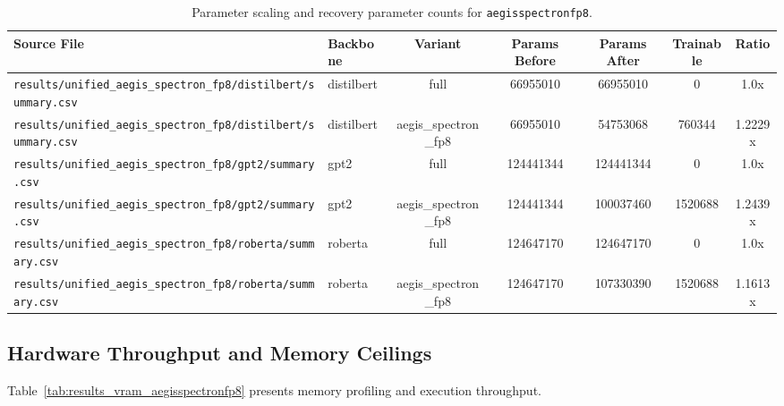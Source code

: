 \begin{table}[t]
\centering
\small
\begin{tabular}{llccccc}
\toprule
\textbf{Source File} & \textbf{Backbone} & \textbf{Variant} & \textbf{Params Before} & \textbf{Params After} & \textbf{Trainable} & \textbf{Ratio} \\
\midrule
\texttt{results/unified\_aegis\_spectron\_fp8/distilbert/summary.csv} & distilbert & full & 66955010 & 66955010 & 0 & 1.0x \\
\texttt{results/unified\_aegis\_spectron\_fp8/distilbert/summary.csv} & distilbert & aegis\_spectron\_fp8 & 66955010 & 54753068 & 760344 & 1.2229x \\
\texttt{results/unified\_aegis\_spectron\_fp8/gpt2/summary.csv} & gpt2 & full & 124441344 & 124441344 & 0 & 1.0x \\
\texttt{results/unified\_aegis\_spectron\_fp8/gpt2/summary.csv} & gpt2 & aegis\_spectron\_fp8 & 124441344 & 100037460 & 1520688 & 1.2439x \\
\texttt{results/unified\_aegis\_spectron\_fp8/roberta/summary.csv} & roberta & full & 124647170 & 124647170 & 0 & 1.0x \\
\texttt{results/unified\_aegis\_spectron\_fp8/roberta/summary.csv} & roberta & aegis\_spectron\_fp8 & 124647170 & 107330390 & 1520688 & 1.1613x \\
\bottomrule
\end{tabular}
\caption{Parameter scaling and recovery parameter counts for \texttt{aegisspectronfp8}.}
\label{tab:results_params_aegisspectronfp8}
\end{table}

\subsection{Hardware Throughput and Memory Ceilings}
Table~\ref{tab:results_vram_aegisspectronfp8} presents memory profiling and execution throughput.

